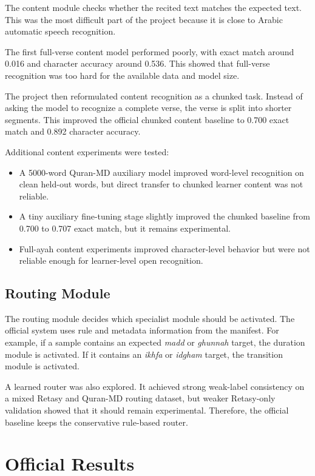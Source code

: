 The content module checks whether the recited text matches the expected text.
This was the most difficult part of the project because it is close to Arabic
automatic speech recognition.

The first full-verse content model performed poorly, with exact match around
0.016 and character accuracy around 0.536. This showed that full-verse
recognition was too hard for the available data and model size.

The project then reformulated content recognition as a chunked task. Instead of
asking the model to recognize a complete verse, the verse is split into shorter
segments. This improved the official chunked content baseline to 0.700 exact
match and 0.892 character accuracy.

Additional content experiments were tested:

\begin{itemize}[leftmargin=*]
    \item A 5000-word Quran-MD auxiliary model improved word-level recognition
    on clean held-out words, but direct transfer to chunked learner content was
    not reliable.
    \item A tiny auxiliary fine-tuning stage slightly improved the chunked
    baseline from 0.700 to 0.707 exact match, but it remains experimental.
    \item Full-ayah content experiments improved character-level behavior but
    were not reliable enough for learner-level open recognition.
\end{itemize}

\subsection{Routing Module}

The routing module decides which specialist module should be activated. The
official system uses rule and metadata information from the manifest. For
example, if a sample contains an expected \textit{madd} or \textit{ghunnah}
target, the duration module is activated. If it contains an \textit{ikhfa} or
\textit{idgham} target, the transition module is activated.

A learned router was also explored. It achieved strong weak-label consistency
on a mixed Retasy and Quran-MD routing dataset, but weaker Retasy-only
validation showed that it should remain experimental. Therefore, the official
baseline keeps the conservative rule-based router.

\section{Official Results}

